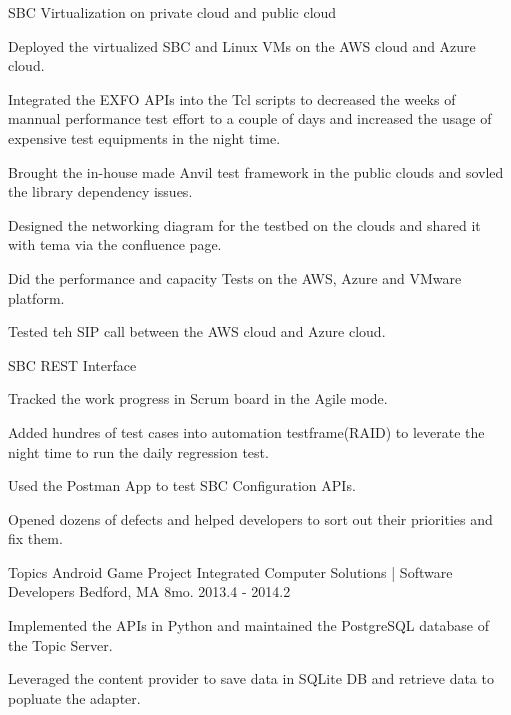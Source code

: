 \begin{cventries}
\cventry
{SBC Virtualization on private cloud and public cloud} %
{} %
{} %
{} %
{ %
\begin{cvitems}
\item {Deployed the virtualized SBC and Linux VMs on the AWS cloud and Azure cloud. }
\item {Integrated the EXFO APIs into the Tcl scripts to decreased the weeks of mannual performance test effort to a couple of days and increased the usage of expensive test equipments in the night time.}
\item {Brought the in-house made Anvil test framework in the public clouds and sovled the library dependency issues. }
\item {Designed the networking diagram for the testbed on the clouds and shared it with tema via the confluence page. }
\item {Did the performance and capacity Tests on the AWS, Azure and VMware platform.}
\item {Tested teh SIP call between the AWS cloud and Azure cloud.}
\end{cvitems}
}


\cventry
{SBC REST Interface} %
{} %
{} %
{} %
{ %
\begin{cvitems}
\item {Tracked the work progress in Scrum board in the Agile mode.}
\item {Added hundres of test cases into automation testframe(RAID) to leverate the night time to run the daily regression test.}
\item {Used the Postman App to test SBC Configuration APIs.}
\item {Opened dozens of defects and helped developers to sort out their priorities and fix them.}
\end{cvitems}
}


\cventry
{Topics Android Game Project} %
{Integrated Computer Solutions | Software Developers} %
{Bedford, MA} %
{8mo. 2013.4 - 2014.2} %
{ %
\begin{cvitems}
\item {Implemented the APIs in Python and maintained the PostgreSQL database of the Topic Server. }
\item {Leveraged the content provider to save data in SQLite DB and retrieve data to popluate the adapter.}
\end{cvitems} 
}


\end{cventries}
